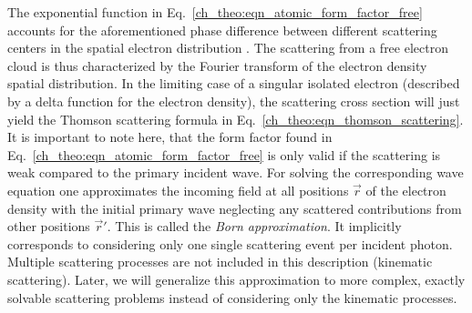 The exponential function in Eq.~\eqref{ch_theo:eqn_atomic_form_factor_free} accounts for the aforementioned phase difference between different scattering centers in the spatial electron distribution \cite{daillant_x-ray_2009}. The scattering from a free electron cloud is thus characterized by the Fourier transform of the electron density spatial distribution. In the limiting case of a singular isolated electron (described by a delta function for the electron density), the scattering cross section will just yield the Thomson scattering formula in Eq.~\eqref{ch_theo:eqn_thomson_scattering}. It is important to note here, that the form factor found in Eq.~\eqref{ch_theo:eqn_atomic_form_factor_free} is only valid if the scattering is weak compared to the primary incident wave. For solving the corresponding wave equation one approximates the incoming field at all positions $\vec{r}$ of the electron density with the initial primary wave neglecting any scattered contributions from other positions $\vec{r}'$. This is called the \emph{Born approximation}. It implicitly corresponds to considering only one single scattering event per incident photon. Multiple scattering processes are not included in this description (kinematic scattering). Later, we will generalize this approximation to more complex, exactly solvable scattering problems instead of considering only the kinematic processes.

